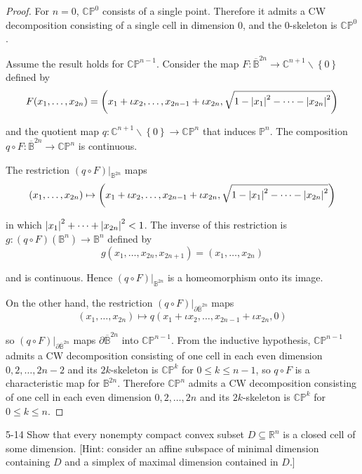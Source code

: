 \begin{proof}
	For \( n = 0 \), \( \mathbb{CP}^{0} \) consists of a single point. Therefore it admits a CW decomposition consisting of a single cell in dimension 0, and the 0-skeleton is \( \mathbb{CP}^{0} \).

	Assume the result holds for \( \mathbb{CP}^{n-1} \). Consider the map \( F: \overline{\mathbb{B}}^{2n} \to \mathbb{C}^{n+1} \smallsetminus \left\{0\right\} \) defined by
	\[
		F(x_{1}, \ldots, x_{2n}) = \left(x_{1} + \iota x_{2}, \dots, x_{2n-1} + \iota x_{2n}, \sqrt{1 - \left\vert{x_{1}}\right\vert^{2} - \cdots - \left\vert{x_{2n}}\right\vert^{2}} \right)
	\]

	and the quotient map \( q: \mathbb{C}^{n+1}\smallsetminus\left\{0\right\} \to \mathbb{CP}^{n} \) that induces \( \mathbb{P}^{n} \). The composition \( q\circ F: \overline{\mathbb{B}}^{2n} \to \mathbb{CP}^{n} \) is continuous.

	The restriction \( (q\circ F)\vert_{\mathbb{B}^{2n}} \) maps
	\[
		(x_{1}, \ldots, x_{2n}) \mapsto \left(x_{1} + \iota x_{2}, \dots, x_{2n-1} + \iota x_{2n}, \sqrt{1 - \left\vert{x_{1}}\right\vert^{2} - \cdots - \left\vert{x_{2n}}\right\vert^{2}} \right)
	\]

	in which \( \left\vert{x_{1}}\right\vert^{2} + \cdots + \left\vert{x_{2n}}\right\vert^{2} < 1 \). The inverse of this restriction is \( g: (q\circ F)(\mathbb{B}^{n}) \to \mathbb{B}^{n} \) defined by
	\[
		g(x_{1}, \ldots, x_{2n}, x_{2n+1}) = (x_{1}, \ldots, x_{2n})
	\]

	and is continuous. Hence \( (q\circ F)\vert_{\mathbb{B}^{2n}} \) is a homeomorphism onto its image.

	On the other hand, the restriction \( (q\circ F)\vert_{\partial\overline{\mathbb{B}}^{2n}} \) maps
	\[
		(x_{1}, \ldots, x_{2n}) \mapsto q(x_{1} + \iota x_{2}, \ldots, x_{2n-1} + \iota x_{2n}, 0)
	\]

	so \( (q\circ F)\vert_{\partial\overline{\mathbb{B}}^{2n}} \) maps \( \partial\overline{\mathbb{B}}^{2n} \) into \( \mathbb{CP}^{n-1} \). From the inductive hypothesis, \( \mathbb{CP}^{n-1} \) admits a CW decomposition consisting of one cell in each even dimension \( 0, 2, \ldots, 2n-2 \) and its \( 2k \)-skeleton is \( \mathbb{CP}^{k} \) for \( 0 \leq k \leq n-1 \), so \( q\circ F \) is a characteristic map for \( \mathbb{B}^{2n} \). Therefore \( \mathbb{CP}^{n} \) admits a CW decomposition consisting of one cell in each even dimension \( 0, 2, \ldots, 2n \) and its \( 2k \)-skeleton is \( \mathbb{CP}^{k} \) for \( 0 \leq k \leq n \).
\end{proof}

\begin{problem}{5-14}\label{problem:5-14}
Show that every nonempty compact convex subset \( D \subseteq \mathbb{R}^{n} \) is a closed cell of some dimension. [Hint: consider an affine subspace of minimal dimension containing \( D \) and a simplex of maximal dimension contained in \( D \).]
\end{problem}

